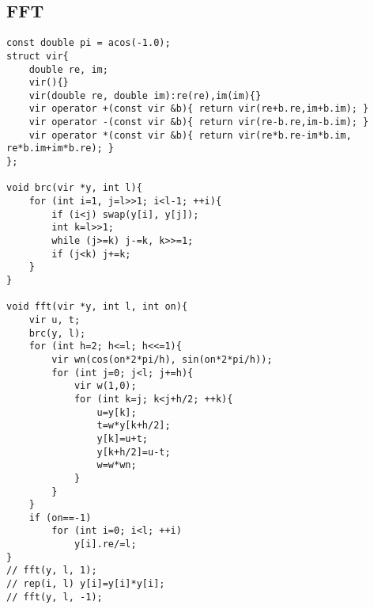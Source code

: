 \subsection{FFT}
\begin{lstlisting}
const double pi = acos(-1.0);
struct vir{
	double re, im;
	vir(){}
	vir(double re, double im):re(re),im(im){}
	vir operator +(const vir &b){ return vir(re+b.re,im+b.im); }
	vir operator -(const vir &b){ return vir(re-b.re,im-b.im); }
	vir operator *(const vir &b){ return vir(re*b.re-im*b.im, re*b.im+im*b.re); }
};

void brc(vir *y, int l){
	for (int i=1, j=l>>1; i<l-1; ++i){
		if (i<j) swap(y[i], y[j]);
		int k=l>>1;
		while (j>=k) j-=k, k>>=1;
		if (j<k) j+=k;
	}
}

void fft(vir *y, int l, int on){
	vir u, t;
	brc(y, l);
	for (int h=2; h<=l; h<<=1){
		vir wn(cos(on*2*pi/h), sin(on*2*pi/h));
		for (int j=0; j<l; j+=h){
			vir w(1,0);
			for (int k=j; k<j+h/2; ++k){
				u=y[k];
				t=w*y[k+h/2];
				y[k]=u+t;
				y[k+h/2]=u-t;
				w=w*wn;
			}
		}
	}
	if (on==-1)
		for (int i=0; i<l; ++i)
			y[i].re/=l;
}
// fft(y, l, 1);
// rep(i, l) y[i]=y[i]*y[i];
// fft(y, l, -1);
\end{lstlisting}
